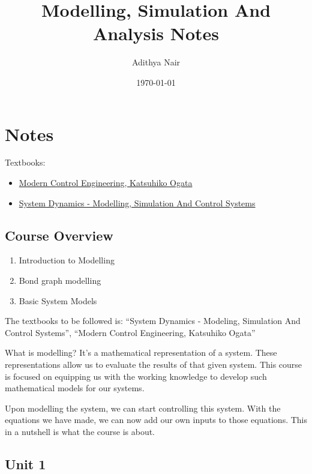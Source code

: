 \documentclass[11pt]{report}
\author{Adithya Nair}
\date{\today}
\title{Modelling, Simulation And Analysis Notes}
\begin{document}
\maketitle
\tableofcontents

\part{Notes}
\label{sec:org34bebc9}
Textbooks:
\begin{itemize}
\item \href{file:///home/adithya/University-Latex-Notes/Modelling, Simulation And Analysis/textbooks/Katsuhiko Ogata - Modern Control Engineering-Prentice Hal (2010).pdf}{Modern Control Engineering, Katsuhiko Ogata}
\item \href{file:///home/adithya/University-Latex-Notes/Modelling, Simulation And Analysis/textbooks/Dean C. Karnopp, Donald L. Margolis, Ronald C. Rosenberg(auth.) - System Dynamics\_ Modeling, Simulation, and Control of Mechatronic Systems, Fifth Edition (2012).pdf}{System Dynamics - Modelling, Simulation And Control Systems}
\end{itemize}
\chapter{Course Overview}
\label{sec:org0b790cd}
\begin{enumerate}
\item Introduction to Modelling
\item Bond graph modelling
\item Basic System Models
\end{enumerate}

The textbooks to be followed is: ``System Dynamics - Modeling, Simulation And Control Systems'', ``Modern Control Engineering, Katsuhiko Ogata''

What is modelling? It's a mathematical representation of a system. These representations allow us to evaluate the results of that given system. This course is focused on equipping us with the working knowledge to develop such mathematical models for our systems.

Upon modelling the system, we can start controlling this system. With the equations we have made, we can now add our own inputs to those equations. This in a nutshell is what the course is about.
\chapter{Unit 1}
\label{sec:orge7fcebd}
\end{document}
